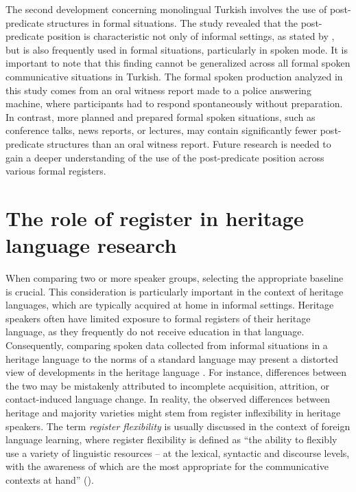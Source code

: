 The second development concerning monolingual Turkish involves the use of post-predicate structures in formal situations. The study revealed that the post-predicate position is characteristic not only of informal settings, as stated by \citet{Erguvanli1984}, but is also frequently used in formal situations, particularly in spoken mode. It is important to note that this finding cannot be generalized across all formal spoken communicative situations in Turkish. The formal spoken production analyzed in this study comes from an oral witness report made to a police answering machine, where participants had to respond spontaneously without preparation. In contrast, more planned and prepared formal spoken situations, such as conference talks, news reports, or lectures, may contain significantly fewer post-predicate structures than an oral witness report. Future research is needed to gain a deeper understanding of the use of the post-predicate position across various formal registers.

\section{The role of register in heritage language research}\label{sec:key:7.3}

\largerpage
When comparing two or more speaker groups, selecting the appropriate baseline is crucial. This consideration is particularly important in the context of heritage languages, which are typically acquired at home in informal settings. Heritage speakers often have limited exposure to formal registers of their heritage language, as they frequently do not receive education in that language. Consequently, comparing spoken data collected from informal situations in a heritage language to the norms of a standard language may present a distorted view of developments in the heritage language \citep{WieseEtAl2022}. For instance, differences between the two may be mistakenly attributed to incomplete acquisition, attrition, or contact-induced language change. In reality, the observed differences between heritage and majority varieties might stem from register inflexibility in heritage speakers. The term \textit{register flexibility} is usually discussed in the context of foreign language learning, where register flexibility is defined as “the ability to flexibly use a variety of linguistic resources – at the lexical, syntactic and discourse levels, with the awareness of which are the most appropriate for the communicative contexts at hand” (\citealt{QinUccelli2020}).

